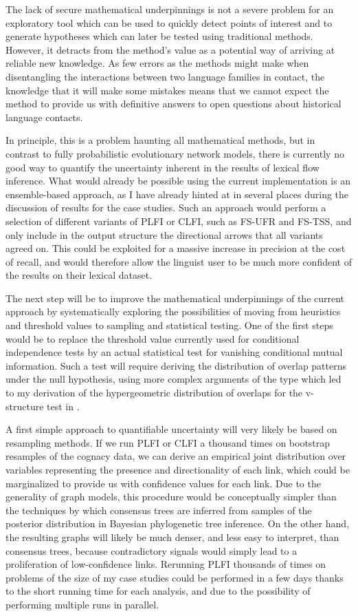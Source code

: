 The lack of secure mathematical underpinnings is not a severe problem for an exploratory tool which can be used to quickly detect points of interest and to generate hypotheses which can later be tested using traditional methods. However, it detracts from the method's value as a potential way of arriving at reliable new knowledge. As few errors as the methods might make when disentangling the interactions between two language families in contact, the knowledge that it will make some mistakes means that we cannot expect the method to provide us with definitive answers to open questions about historical language contacts. 

In principle, this is a problem haunting all mathematical methods, but in contrast to fully probabilistic evolutionary network models, there is currently no good way to quantify the uncertainty inherent in the results of lexical flow inference. What would already be possible using the current implementation is an ensemble-based approach, as I have already hinted at in several places during the discussion of results for the case studies. Such an approach would perform a selection of different variants of PLFI or CLFI, such as FS-UFR and FS-TSS, and only include in the output structure the directional arrows that all variants agreed on. This could be exploited for a massive increase in precision at the cost of recall, and would therefore allow the linguist user to be much more confident of the results on their lexical dataset.

\largerpage
The next step will be to improve the mathematical underpinnings of the current approach by systematically exploring the possibilities of moving from heuristics and threshold values to sampling and statistical testing. One of the first steps would be to replace the threshold value currently used for conditional independence tests by an actual statistical test for vanishing conditional mutual information. Such a test will require deriving the distribution of overlap patterns under the null hypothesis, using more complex arguments of the type which led to my derivation of the hypergeometric distribution of overlaps for the v-structure test in .

A first simple approach to quantifiable uncertainty will very likely be based on resampling methods. If we run PLFI or CLFI a thousand times on bootstrap resamples of the cognacy data, we can derive an empirical joint distribution over variables representing the presence and directionality of each link, which could be marginalized to provide us with confidence values for each link. Due to the generality of graph models, this procedure would be conceptually simpler than the techniques by which consensus trees are inferred from samples of the posterior distribution in Bayesian phylogenetic tree inference. On the other hand, the resulting graphs will likely be much denser, and less easy to interpret, than consensus trees, because contradictory signals would simply lead to a proliferation of low-confidence links. Rerunning PLFI thousands of times on problems of the size of my case studies could be performed in a few days thanks to the short running time for each analysis, and due to the possibility of performing multiple runs in parallel.

